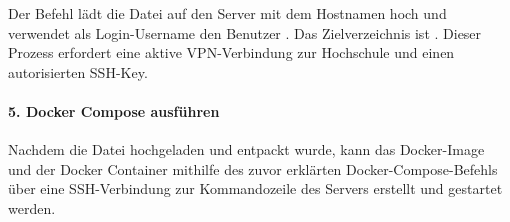 Der Befehl lädt die Datei  auf den Server mit dem Hostnamen  hoch und verwendet als Login-Username den Benutzer . Das Zielverzeichnis ist . Dieser Prozess erfordert eine aktive VPN-Verbindung zur Hochschule und einen autorisierten SSH-Key. %

\paragraph*{5. Docker Compose ausführen}
Nachdem die Datei hochgeladen und entpackt wurde, kann das Docker-Image und der Docker Container mithilfe des zuvor erklärten Docker-Compose-Befehls über eine SSH-Verbindung zur Kommandozeile des Servers erstellt und gestartet werden.

